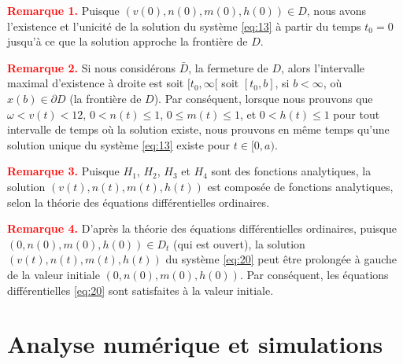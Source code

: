 \documentclass[10pt,french]{beamer}
\begin{document}
	\begin{frame}
		\begin{boxR}
			\textbf{\textcolor{red}{Remarque 1.}} Puisque $(v(0), n(0), m(0), h(0)) \in D$, nous avons l'existence et l'unicité de la solution du système \eqref{eq:13} à partir du temps $t_0 = 0$ jusqu'à ce que la solution approche la frontière de $D$.
		\end{boxR}
		
		\begin{boxR}
			\textbf{\textcolor{red}{Remarque 2.}} Si nous considérons $\bar{D}$, la fermeture de $D$, alors l'intervalle maximal d'existence à droite est soit $[t_0, \infty[$ soit $[t_0, b]$, si $b < \infty$, où $x(b) \in \partial D$ (la frontière de $D$). Par conséquent, lorsque nous prouvons que $\omega < v(t) < 12$, $0 < n(t) \leq 1$, $0 \leq m(t) \leq 1$, et $0 < h(t) \leq 1$ pour tout intervalle de temps où la solution existe, nous prouvons en même temps qu'une solution unique du système \eqref{eq:13} existe pour $t \in [0, a)$.
		\end{boxR}
	\end{frame}
	
	\begin{frame}
		\begin{boxR}
			\textbf{\textcolor{red}{Remarque 3.}} Puisque $H_1$, $H_2$, $H_3$ et $H_4$ sont des fonctions analytiques, la solution $(v(t), n(t), m(t), h(t))$ est composée de fonctions analytiques, selon la théorie des équations différentielles ordinaires.
		\end{boxR}
		
		\begin{boxR}
			\textbf{\textcolor{red}{Remarque 4.}} D'après la théorie des équations différentielles ordinaires, puisque $(0, n(0), m(0), h(0)) \in D_t$ (qui est ouvert), la solution $(v(t), n(t), m(t), h(t))$ du système \eqref{eq:20} peut être prolongée à gauche de la valeur initiale $(0, n(0), m(0), h(0))$. Par conséquent, les équations différentielles \eqref{eq:20} sont satisfaites à la valeur initiale.
		\end{boxR}
	\end{frame}
	
	\section{Analyse numérique et simulations}
	
\end{document}
